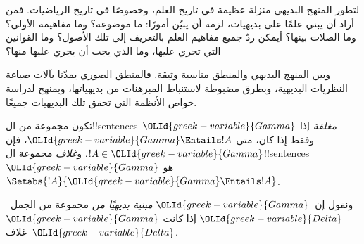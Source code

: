 \documentclass[../../../include/open-logic-section]{subfiles}
\begin{document}

\begin{explain}
لتطور المنهج البديهي منزلة عظيمة في تاريخ العلم، وخصوصًا في
تاريخ الرياضيات. فمن أراد أن يبني علمًا على بديهيات، لزمه أن
يبيّن أمورًا: ما موضوعه؟ وما مفاهيمه الأولى؟ وما الصلات بينها؟
أيمكن ردّ جميع مفاهيم العلم بالتعريف إلى تلك الأصول؟ وما القوانين
التي تجري عليها، وما الذي يجب أن يجري عليها منها؟

وبين المنهج البديهي والمنطق مناسبة وثيقة. فالمنطق الصوري يمدّنا
بآلات صياغة النظريات البديهية، وبطرق مضبوطة لاستنباط المبرهنات
من بديهياتها، وبمنهج لدراسة خواص الأنظمة التي تحقق تلك البديهيات
جميعًا.
\end{explain}

\begin{defn}
تكون مجموعة من ال!!{sentence}s~$\OLId{greek-variable}{Gamma}$ \emph{مغلقة} إذا وفقط إذا
كان، متى $\OLId{greek-variable}{Gamma} \Entails !A$، فإن $!A \in \OLId{greek-variable}{Gamma}$. و\emph{غلاف}
مجموعة ال!!{sentence}s~$\OLId{greek-variable}{Gamma}$ هو
$\Setabs{!A}{\OLId{greek-variable}{Gamma} \Entails !A}$.

ونقول إن~$\OLId{greek-variable}{Gamma}$ \emph{مبنية بديهيًا من} مجموعة من الجمل~$\OLId{greek-variable}{Delta}$
إذا كانت $\OLId{greek-variable}{Gamma}$ غلاف~$\OLId{greek-variable}{Delta}$.
\end{defn}
\end{document}
